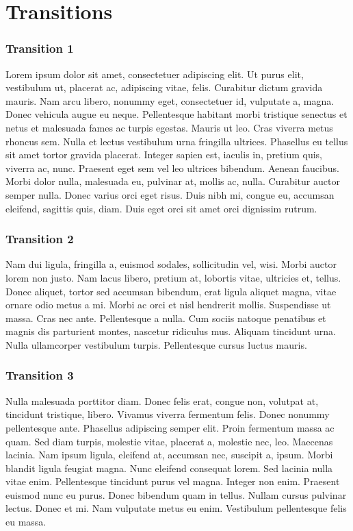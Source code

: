 \documentclass{beamer}
\begin{document}
\section{Transitions}
\begin{frame}
\frametitle{Transition 1}
\transdissolve
Lorem ipsum dolor sit amet, consectetuer adipiscing elit. Ut purus
elit, vestibulum ut, placerat ac, adipiscing vitae, felis. Curabitur
dictum gravida mauris. Nam arcu libero, nonummy eget,
consectetuer id, vulputate a, magna. Donec vehicula augue eu
neque. Pellentesque habitant morbi tristique senectus et netus et
malesuada fames ac turpis egestas. Mauris ut leo. Cras viverra
metus rhoncus sem. Nulla et lectus vestibulum urna fringilla
ultrices. Phasellus eu tellus sit amet tortor gravida placerat.
Integer sapien est, iaculis in, pretium quis, viverra ac, nunc.
Praesent eget sem vel leo ultrices bibendum. Aenean faucibus.
Morbi dolor nulla, malesuada eu, pulvinar at, mollis ac, nulla.
Curabitur auctor semper nulla. Donec varius orci eget risus. Duis
nibh mi, congue eu, accumsan eleifend, sagittis quis, diam. Duis
eget orci sit amet orci dignissim rutrum.   
\end{frame}

\begin{frame}
\frametitle{Transition 2}
\transblindshorizontal
    Nam dui ligula, fringilla a, euismod sodales, sollicitudin vel, wisi.
Morbi auctor lorem non justo. Nam lacus libero, pretium at,
lobortis vitae, ultricies et, tellus. Donec aliquet, tortor sed
accumsan bibendum, erat ligula aliquet magna, vitae ornare odio
metus a mi. Morbi ac orci et nisl hendrerit mollis. Suspendisse ut
massa. Cras nec ante. Pellentesque a nulla. Cum sociis natoque
penatibus et magnis dis parturient montes, nascetur ridiculus mus.
Aliquam tincidunt urna. Nulla ullamcorper vestibulum turpis.
Pellentesque cursus luctus mauris.
\end{frame}

\begin{frame}
\frametitle{Transition 3}
\transblindsvertical
Nulla malesuada porttitor diam. Donec felis erat, congue non,
volutpat at, tincidunt tristique, libero. Vivamus viverra fermentum
felis. Donec nonummy pellentesque ante. Phasellus adipiscing
semper elit. Proin fermentum massa ac quam. Sed diam turpis,
molestie vitae, placerat a, molestie nec, leo. Maecenas lacinia.
Nam ipsum ligula, eleifend at, accumsan nec, suscipit a, ipsum.
Morbi blandit ligula feugiat magna. Nunc eleifend consequat
lorem. Sed lacinia nulla vitae enim. Pellentesque tincidunt purus
vel magna. Integer non enim. Praesent euismod nunc eu purus.
Donec bibendum quam in tellus. Nullam cursus pulvinar lectus.
Donec et mi. Nam vulputate metus eu enim. Vestibulum
pellentesque felis eu massa.
    
\end{frame}
\end{document}

